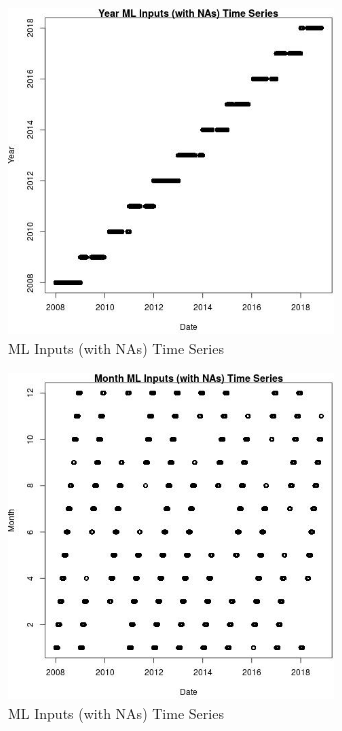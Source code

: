 \begin{figure} 
\centering  
\includegraphics[width=0.77\textwidth]{Code_Outputs/Report_ML_input_PM25_Step4_part_e_de_duplicated_aves_compiled_2019-05-20wNAs_YearvDate.jpg} 
\caption{\label{fig:Report_ML_input_PM25_Step4_part_e_de_duplicated_aves_compiled_2019-05-20wNAsYearvDate}ML Inputs (with NAs) Time Series} 
\end{figure} 
 

\begin{figure} 
\centering  
\includegraphics[width=0.77\textwidth]{Code_Outputs/Report_ML_input_PM25_Step4_part_e_de_duplicated_aves_compiled_2019-05-20wNAs_MonthvDate.jpg} 
\caption{\label{fig:Report_ML_input_PM25_Step4_part_e_de_duplicated_aves_compiled_2019-05-20wNAsMonthvDate}ML Inputs (with NAs) Time Series} 
\end{figure} 
 


